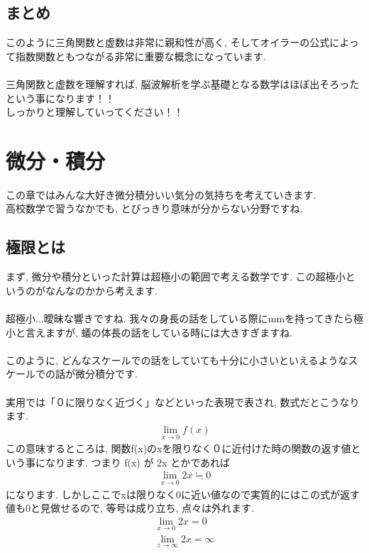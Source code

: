 \documentclass[11pt,a4paper,uplatex]{ujreport}
\begin{document}
\section{まとめ}
このように三角関数と虚数は非常に親和性が高く, そしてオイラーの公式によって指数関数ともつながる非常に重要な概念になっています. \\
\\
三角関数と虚数を理解すれば, 脳波解析を学ぶ基礎となる数学はほぼ出そろったという事になります！！\\
しっかりと理解していってください！！\\

\chapter{微分・積分}
この章ではみんな大好き微分積分いい気分の気持ちを考えていきます.\\
高校数学で習うなかでも, とびっきり意味が分からない分野ですね.\\
\section{極限とは}
まず, 微分や積分といった計算は超極小の範囲で考える数学です. この超極小というのがなんなのかから考えます.\\
\\
超極小...曖昧な響きですね. 我々の身長の話をしている際にmmを持ってきたら極小と言えますが, 蟻の体長の話をしている時には大きすぎますね. \\
\\
このように, どんなスケールでの話をしていても十分に小さいといえるようなスケールでの話が微分積分です.\\
\\
実用では「０に限りなく近づく」などといった表現で表され, 数式だとこうなります.
\begin{eqnarray}
\lim_{x\to0} f(x)
\end{eqnarray}
この意味するところは, 関数f(x)のxを限りなく０に近付けた時の関数の返す値という事になります. つまり f(x) が 2x とかであれば
\begin{eqnarray}
\lim_{x\to0} 2x \fallingdotseq 0
\end{eqnarray}
になります. しかしここでxは限りなく0に近い値なので実質的にはこの式が返す値も0と見做せるので, 等号は成り立ち, 点々は外れます.
\begin{eqnarray}
\lim_{x\to0} 2x = 0\\
\lim_{z\to\infty} 2x = \infty
\end{eqnarray}
\end{document}

